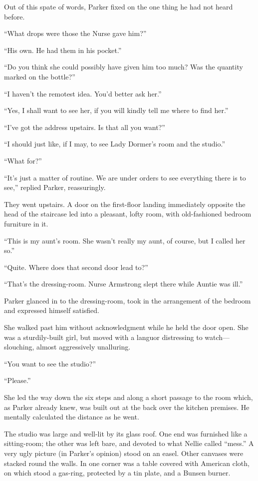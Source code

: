 Out of this spate of words, Parker fixed on the one thing he had not heard before.

\enquote{What drops were those the Nurse gave him?}

\enquote{His own. He had them in his pocket.}

\enquote{Do you think she could possibly have given him too much? Was the quantity marked on the bottle?}

\enquote{I haven't the remotest idea. You'd better ask her.}

\enquote{Yes, I shall want to see her, if you will kindly tell me where to find her.}

\enquote{I've got the address upstairs. Is that all you want?}

\enquote{I should just like, if I may, to see Lady Dormer's room and the studio.}

\enquote{What for?}

\enquote{It's just a matter of routine. We are under orders to see everything there is to see,} replied Parker, reassuringly.

They went upstairs. A door on the first-floor landing immediately opposite the head of the staircase led into a pleasant, lofty room, with old-fashioned bedroom furniture in it.

\enquote{This is my aunt's room. She wasn't really my aunt, of course, but I called her so.}

\enquote{Quite. Where does that second door lead to?}

\enquote{That's the dressing-room. Nurse Armstrong slept there while Auntie was ill.}

Parker glanced in to the dressing-room, took in the arrangement of the bedroom and expressed himself satisfied.

She walked past him without acknowledgment while he held the door open. She was a sturdily-built girl, but moved with a languor distressing to watch\allowbreak---\allowbreak slouching, almost aggressively unalluring.

\enquote{You want to see the studio?}

\enquote{Please.}

She led the way down the six steps and along a short passage to the room which, as Parker already knew, was built out at the back over the kitchen premises. He mentally calculated the distance as he went.

The studio was large and well-lit by its glass roof. One end was furnished like a sitting-room; the other was left bare, and devoted to what Nellie called \enquote{mess.} A very ugly picture (in Parker's opinion) stood on an easel. Other canvases were stacked round the walls. In one corner was a table covered with American cloth, on which stood a gas-ring, protected by a tin plate, and a Bunsen burner.

